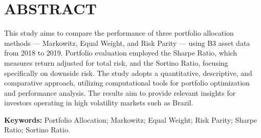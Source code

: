 
\chapter*{ABSTRACT}

\vspace{1cm}

This study aims to compare the performance of three portfolio allocation methods --- Markowitz, Equal Weight, and Risk Parity --- using B3 asset data from 2018 to 2019. Portfolio evaluation employed the Sharpe Ratio, which measures return adjusted for total risk, and the Sortino Ratio, focusing specifically on downside risk. The study adopts a quantitative, descriptive, and comparative approach, utilizing computational tools for portfolio optimization and performance analysis. The results aim to provide relevant insights for investors operating in high volatility markets such as Brazil.

\vspace{0.5cm}

\noindent
\textbf{Keywords:} Portfolio Allocation; Markowitz; Equal Weight; Risk Parity; Sharpe Ratio; Sortino Ratio.